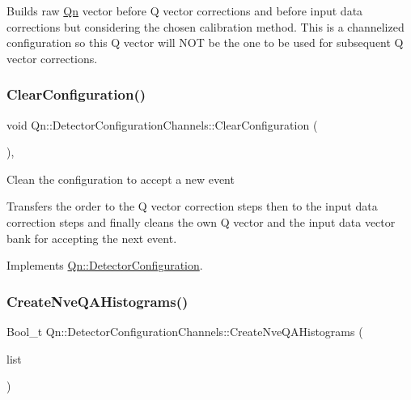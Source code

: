 Builds raw \mbox{\hyperlink{namespaceQn}{Qn}} vector before Q vector corrections and before input data corrections but considering the chosen calibration method. This is a channelized configuration so this Q vector will N\+OT be the one to be used for subsequent Q vector corrections. \mbox{\label{classQn_1_1DetectorConfigurationChannels_a692b4880a3a694cf9a3ad860cb3f7b52}} 
\subsubsection{\texorpdfstring{Clear\+Configuration()}{ClearConfiguration()}}
{\footnotesize\ttfamily void Qn\+::\+Detector\+Configuration\+Channels\+::\+Clear\+Configuration (\begin{DoxyParamCaption}{ }\end{DoxyParamCaption})\hspace{0.3cm}{\ttfamily [inline]}, {\ttfamily [virtual]}}

Clean the configuration to accept a new event

Transfers the order to the Q vector correction steps then to the input data correction steps and finally cleans the own Q vector and the input data vector bank for accepting the next event. 

Implements \mbox{\hyperlink{classQn_1_1DetectorConfiguration_a94c21b39a4a3680675319aacf4a517f4}{Qn\+::\+Detector\+Configuration}}.

\mbox{\label{classQn_1_1DetectorConfigurationChannels_a62452177f5059e64977c5c1fc079de0b}} 
\subsubsection{\texorpdfstring{Create\+Nve\+Q\+A\+Histograms()}{CreateNveQAHistograms()}}
{\footnotesize\ttfamily Bool\+\_\+t Qn\+::\+Detector\+Configuration\+Channels\+::\+Create\+Nve\+Q\+A\+Histograms (\begin{DoxyParamCaption}\item[{T\+List $\ast$}]{list }\end{DoxyParamCaption})\hspace{0.3cm}{\ttfamily [virtual]}}

